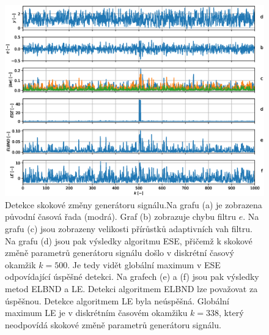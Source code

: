 \begin{figure}[h!]
    \centering
    \includegraphics[scale=0.6]{IMG/mdpi/stepchange.eps}
    \caption{Detekce skokové změny generátoru signálu.Na grafu (a) je zobrazena původní časová řada (modrá). Graf (b) zobrazuje chybu filtru $e$. Na grafu (c) jsou zobrazeny velikosti přírůstků adaptivních vah filtru. Na grafu (d) jsou pak výsledky algoritmu ESE, přičemž k skokové změně parametrů generátoru signálu došlo v diskrétní časový okamžik $k=500$. Je tedy vidět globální maximum v ESE odpovídající úspěšné detekci. Na grafech (e) a (f) jsou pak výsledky metod ELBND a LE. Detekci algoritmem ELBND lze považovat za úspěšnou. Detekce algoritmem LE byla neúspěšná. Globální maximum LE je v diskrétním časovém okamžiku $k=338$, který neodpovídá skokové změně parametrů generátoru signálu.}
    \label{fig:step_change}
\end{figure}

